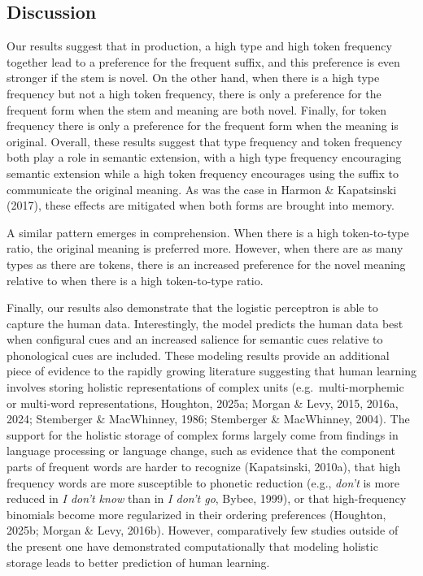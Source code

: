 \documentclass[
  letterpaper,
  DIV=11,
  numbers=noendperiod]{scrartcl}
\begin{document}
\subsection{Discussion}\label{discussion}

Our results suggest that in production, a high type and high token
frequency together lead to a preference for the frequent suffix, and
this preference is even stronger if the stem is novel. On the other
hand, when there is a high type frequency but not a high token
frequency, there is only a preference for the frequent form when the
stem and meaning are both novel. Finally, for token frequency there is
only a preference for the frequent form when the meaning is original.
Overall, these results suggest that type frequency and token frequency
both play a role in semantic extension, with a high type frequency
encouraging semantic extension while a high token frequency encourages
using the suffix to communicate the original meaning. As was the case in
Harmon \& Kapatsinski (2017), these effects are mitigated when both
forms are brought into memory.

A similar pattern emerges in comprehension. When there is a high
token-to-type ratio, the original meaning is preferred more. However,
when there are as many types as there are tokens, there is an increased
preference for the novel meaning relative to when there is a high
token-to-type ratio.

Finally, our results also demonstrate that the logistic perceptron is
able to capture the human data. Interestingly, the model predicts the
human data best when configural cues and an increased salience for
semantic cues relative to phonological cues are included. These modeling
results provide an additional piece of evidence to the rapidly growing
literature suggesting that human learning involves storing holistic
representations of complex units (e.g.~multi-morphemic or multi-word
representations, Houghton, 2025a; Morgan \& Levy, 2015, 2016a, 2024;
Stemberger \& MacWhinney, 1986; Stemberger \& MacWhinney, 2004). The
support for the holistic storage of complex forms largely come from
findings in language processing or language change, such as evidence
that the component parts of frequent words are harder to recognize
(Kapatsinski, 2010a), that high frequency words are more susceptible to
phonetic reduction (e.g., \emph{don't} is more reduced in \emph{I don't
know} than in \emph{I don't go}, Bybee, 1999), or that high-frequency
binomials become more regularized in their ordering preferences
(Houghton, 2025b; Morgan \& Levy, 2016b). However, comparatively few
studies outside of the present one have demonstrated computationally
that modeling holistic storage leads to better prediction of human
learning.
\end{document}
